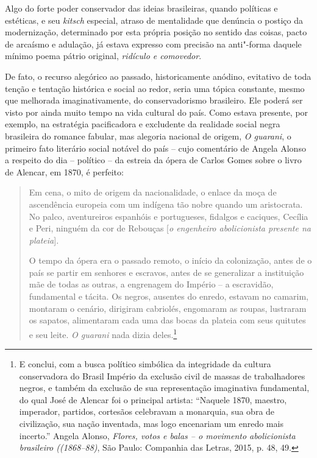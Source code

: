 Algo do forte poder conservador das ideias brasileiras, quando políticas
e estéticas, e seu \emph{kitsch} especial, atraso de mentalidade que
denúncia o postiço da modernização, determinado por esta própria posição
no sentido das coisas, pacto de arcaísmo e adulação, já estava expresso
com precisão na anti"-forma daquele mínimo poema pátrio original,
\emph{ridículo e comovedor}.

De fato, o recurso alegórico ao passado, historicamente anódino,
evitativo de toda tenção e tentação histórica e social ao redor, seria
uma tópica constante, mesmo que melhorada imaginativamente, do
conservadorismo brasileiro. Ele poderá ser visto por ainda muito tempo
na vida cultural do país. Como estava presente, por exemplo, na
estratégia pacificadora e excludente da realidade social negra
brasileira do romance fabular, mas alegoria nacional de origem, \emph{O
guarani}, o primeiro fato literário social notável do país -- cujo
comentário de Angela Alonso a respeito do dia -- político -- da estreia
da ópera de Carlos Gomes sobre o livro de Alencar, em 1870, é perfeito:

\begin{quote}
Em cena, o mito de origem da nacionalidade, o enlace da moça de
ascendência europeia com um indígena tão nobre quando um aristocrata. No
palco, aventureiros espanhóis e portugueses, fidalgos e caciques,
Cecília e Peri, ninguém da cor de Rebouças {[}\emph{o engenheiro
abolicionista presente na plateia}{]}.

O tempo da ópera era o passado
remoto, o início da colonização, antes de o país se partir em senhores e
escravos, antes de se generalizar a instituição mãe de todas as outras,
a engrenagem do Império -- a escravidão, fundamental e tácita. Os
negros, ausentes do enredo, estavam no camarim, montaram o cenário,
dirigiram cabriolés, engomaram as roupas, lustraram os sapatos,
alimentaram cada uma das bocas da plateia com seus quitutes e seu leite.
\emph{O guarani} nada dizia deles.\footnote{E conclui, com a busca
  político simbólica da integridade da cultura conservadora do Brasil
  Império da exclusão civil de massas de trabalhadores negros, e também
  da exclusão de sua representação imaginativa fundamental, do qual José
  de Alencar foi o principal artista: ``Naquele 1870, maestro,
  imperador, partidos, cortesãos celebravam a monarquia, sua obra de
  civilização, sua nação inventada, mas logo encenariam um enredo mais
  incerto.'' Angela Alonso, \emph{Flores, votos e balas -- o movimento
  abolicionista brasileiro ((1868--88)}, São Paulo: Companhia das Letras,
  2015, p. 48, 49.}
\end{quote}

